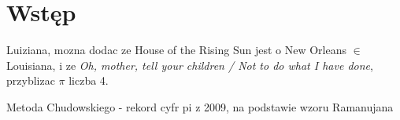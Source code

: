 \documentclass[11pt, wide, leqno]{mwart}
\begin{document}
\maketitle
\tableofcontents

\section{Wstęp}\label{sec:ws}

Luiziana, mozna dodac ze House of the Rising Sun jest o New Orleans $\in$ Louisiana, i ze \emph{Oh, mother, tell your children / Not to do what I have done}, przyblizac $\pi$ liczba 4.

Metoda Chudowskiego - rekord cyfr pi z 2009, na podstawie wzoru Ramanujana




\end{document}
